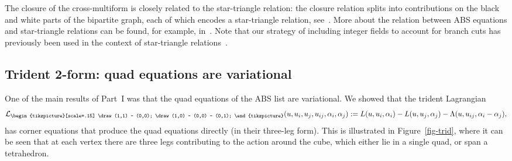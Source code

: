 \documentclass[pdftex]{sigma}
\newcommand{\trileg}{{\begin{tikzpicture}[scale=.15]
			\draw (1,1) -- (0,0);
			\draw (1,0) -- (0,0) -- (0,1);
\end{tikzpicture}}}
\newcommand{\cL}{\mathcal{L}}
\numberwithin{equation}{section}
\begin{document}
The closure of the cross-multiform is closely related to the star-triangle relation: the closure relation splits into contributions on the black and white parts of the bipartite graph, each of which encodes a star-triangle relation, see~\cite[Theorem~2]{bobenko2010lagrangian}.
More about the relation between ABS equations and star-triangle relations can be found, for example, in~\cite{bazhanov2016quasiclassical}. Note that our strategy of including integer fields to account for branch cuts has previously been used in the context of star-triangle relations~\cite{kels2021interaction, kels2023Twocomponent}.

\subsection{Trident 2-form: quad equations are variational}

One of the main results of Part~I was that the quad equations of the ABS list are variational. We showed that the trident Lagrangian
\[
 \cL_\trileg(u,u_i,u_j,u_{ij},\alpha_i,\alpha_j) := L(u,u_i,\alpha_i) - L(u,u_j,\alpha_j) - \Lambda(u,u_{ij}, \alpha_i-\alpha_j) ,
\]
has corner equations that produce the quad equations directly (in their three-leg form).
This is illustrated in Figure~\ref{fig-trid}, where it can be seen that at each vertex there are three legs contributing to the action around the cube, which either lie in a single quad, or span a tetrahedron.
\end{document}
